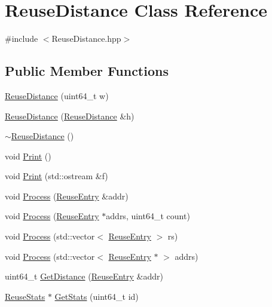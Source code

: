 \hypertarget{class_reuse_distance}{
\section{ReuseDistance Class Reference}
\label{class_reuse_distance}
}


{\ttfamily \#include $<$ReuseDistance.hpp$>$}

\subsection*{Public Member Functions}
\begin{DoxyCompactItemize}
\item 
\hyperlink{class_reuse_distance_ab68a2d9df5c28571c3f8820c5344b2c1}{ReuseDistance} (uint64\_\-t w)
\item 
\hyperlink{class_reuse_distance_afff6c1153a623c687e1014df799c286d}{ReuseDistance} (\hyperlink{class_reuse_distance}{ReuseDistance} \&h)
\item 
\hyperlink{class_reuse_distance_a2846a6f2c045759657b754838045900d}{$\sim$ReuseDistance} ()
\item 
void \hyperlink{class_reuse_distance_a0cbab308f0c9262e570b994beac0544a}{Print} ()
\item 
void \hyperlink{class_reuse_distance_ac798c03bb891a51a6648df4b49e25212}{Print} (std::ostream \&f)
\item 
void \hyperlink{class_reuse_distance_a4ff6b77022ce62e0fdefa5cc297b932a}{Process} (\hyperlink{struct_reuse_entry}{ReuseEntry} \&addr)
\item 
void \hyperlink{class_reuse_distance_aed9cbdd99de67972a37de4624614de9d}{Process} (\hyperlink{struct_reuse_entry}{ReuseEntry} $\ast$addrs, uint64\_\-t count)
\item 
void \hyperlink{class_reuse_distance_a372960c10d5fb6552c8dfcfd77da38ba}{Process} (std::vector$<$ \hyperlink{struct_reuse_entry}{ReuseEntry} $>$ rs)
\item 
void \hyperlink{class_reuse_distance_a88052f5ae1e69bab8fe1f9b7b87c1037}{Process} (std::vector$<$ \hyperlink{struct_reuse_entry}{ReuseEntry} $\ast$ $>$ addrs)
\item 
uint64\_\-t \hyperlink{class_reuse_distance_ac70a23e9dc4b242f11d76e257e894bef}{GetDistance} (\hyperlink{struct_reuse_entry}{ReuseEntry} \&addr)
\item 
\hyperlink{class_reuse_stats}{ReuseStats} $\ast$ \hyperlink{class_reuse_distance_a771580c25dc5140969919e959e2ebdd1}{GetStats} (uint64\_\-t id)

\end{DoxyCompactItemize}
